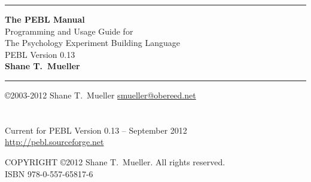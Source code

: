 \documentclass[10pt,twoside,openright,titlepage,letter]{book}
\begin{document}
\rule{\textwidth}{1mm}
\begin{center}
\LARGE
\textbf{The PEBL Manual} \\

\large
Programming and Usage Guide for\\
The Psychology Experiment Building Language\\
PEBL Version 0.13\\
\vspace{0.7cm}\Large \textbf{Shane T.~Mueller}
\end{center}
\rule{\textwidth}{1mm}


\vspace{.4cm}

\normalsize
\noindent\copyright 2003-2012 Shane T.~Mueller \href{mailto:smueller@obereed.net}{smueller@obereed.net}\\
\\
\\


Current for PEBL Version 0.13 -- September 2012 \\
\href{http://pebl.sourceforge.net}{http://pebl.sourceforge.net}


\newpage
\normalsize
\noindent COPYRIGHT \copyright 2012 Shane T.~Mueller. All rights reserved.\\
\vspace{2cm}
ISBN  978-0-557-65817-6\\

\tableofcontents

\clearpage
{}
\renewcommand{\chaptermark}[1]{\markboth{\textbf{Chapter \thechapter}.\ \emph{#1}}{}}







\appendix
\end{document}
